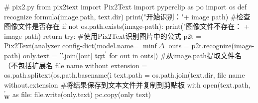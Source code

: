 # pix2.py
from pix2text import Pix2Text
import pyperclip as po
import os
def recognize formula(image.path, text.dir)
print("开始识别："+ image path)
#检查图像文件是否存在
if not os.path.exists(image-path):
print("图像文件不存在：
+ image path)
return
try:
#使用Pix2Text识别图片中的公式
p2t = Pix2Text(analyzer config-dict(model.name=
 $\operatorname*{minf}\Delta^{\cdot}$ 
outs = p2t.recognize(image-path)
only.text = '\n'.join([out[
 ${\mathfrak{t e x t}}^{\prime}$ 
for out in outs])
#从image.path提取文件名（不包括扩展名
file name without extension = os.path.splitext(os.path.basename(i
text.path = os.path.join(text.dir, file name without.extension
#将结果保存到文本文件并复制到剪贴板
with open(text.path,
 ${\mathbf{}}_{\mathbf{W}}^{\prime}$ 
as file:
file.write(only.text)
pc.copy(only text)